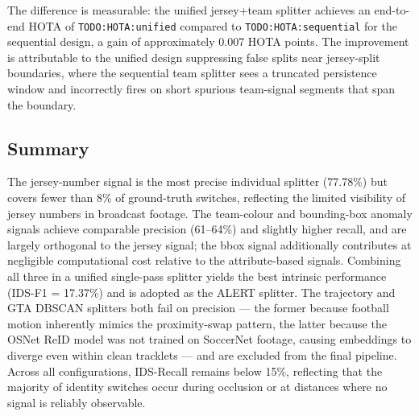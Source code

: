 The difference is measurable: the unified jersey+team splitter achieves an
end-to-end HOTA of \texttt{TODO:HOTA:unified} compared to
\texttt{TODO:HOTA:sequential} for the sequential design, a gain of
approximately 0.007 HOTA points. The improvement is attributable to the
unified design suppressing false splits near jersey-split boundaries, where
the sequential team splitter sees a truncated persistence window and
incorrectly fires on short spurious team-signal segments that span the
boundary.

\subsection{Summary}\label{subsec:splitter_summary}

The jersey-number signal is the most precise individual splitter (77.78\%)
but covers fewer than 8\% of ground-truth switches, reflecting the limited
visibility of jersey numbers in broadcast footage. The team-colour and
bounding-box anomaly signals achieve comparable precision (61--64\%) and
slightly higher recall, and are largely orthogonal to the jersey signal; the
bbox signal additionally contributes at negligible computational cost relative
to the attribute-based signals. Combining all three in a unified single-pass
splitter yields the best intrinsic performance (IDS-F1 = 17.37\%) and is
adopted as the ALERT splitter. The trajectory and GTA DBSCAN splitters both
fail on precision — the former because football motion inherently mimics the
proximity-swap pattern, the latter because the OSNet ReID model was not trained on SoccerNet footage,
causing embeddings to diverge even within clean tracklets — and are excluded
from the final pipeline. Across all
configurations, IDS-Recall remains below 15\%, reflecting that the majority of
identity switches occur during occlusion or at distances where no signal is
reliably observable.
